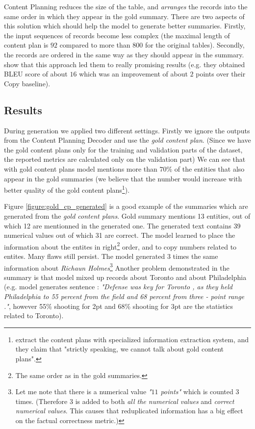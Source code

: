 Content Planning reduces the size of the table, and \emph{arranges} the records into the same order in which they appear in the gold summary. There are two aspects of this solution which should help the model to generate better summaries. Firstly, the input sequences of records become less complex (the maximal length of content plan is $92$ compared to more than $800$ for the original tables). Secondly, the records are ordered in the same way as they should appear in the summary. \citet{puduppully2019datatotext} show that this approach led them to really promising results (e.g. they obtained BLEU score of about $16$ which was an improvement of about $2$ points over their Copy baseline).

\subsection{Results}

During generation we applied two different settings. Firstly we ignore the outputs from the Content Planning Decoder and use the \emph{gold content plan}. (Since we have the gold content plans only for the training and validation parts of the dataset, the reported metrics are calculated only on the validation part) We can see that with gold content plans model mentions more than $70$\% of the entities that also appear in the gold summaries (we believe that the number would increase with better quality of the gold content plans\footnote{\citet{puduppully2019datatotext} extract the content plans with specialized information extraction system, and they claim that "strictly speaking, we cannot talk about gold content plans".}).

Figure \ref{figure:gold_cp_generated} is a good example of the summaries which are generated from the \emph{gold content plans}. Gold summary mentions 13 entities, out of which 12 are mentionned in the generated one. The generated text contains 39 numerical values out of which 31 are correct. The model learned to place the information about the entites in right\footnote{The same order as in the gold summaries.} order, and to copy numbers related to entites. Many flaws still persist. The model generated 3 times the same information about \emph{Richaun Holmes}\footnote{Let me note that there is a numerical value \emph{"$11$ points"} which is counted 3 times. (Therefore $3$ is added to both \emph{all the numerical values} and \emph{correct numerical values}. This causes that reduplicated information has a big effect on the factual correctness metric.)} Another problem demonstrated in the summary is that model mixed up records about Toronto and about Philadelphia (e.g. model generates sentence : \emph{"Defense was key for Toronto , as they held Philadelphia to 55 percent from the field and 68 percent from three - point range ."}, however 55\% shooting for 2pt and 68\% shooting for 3pt are the statistics related to Toronto).

